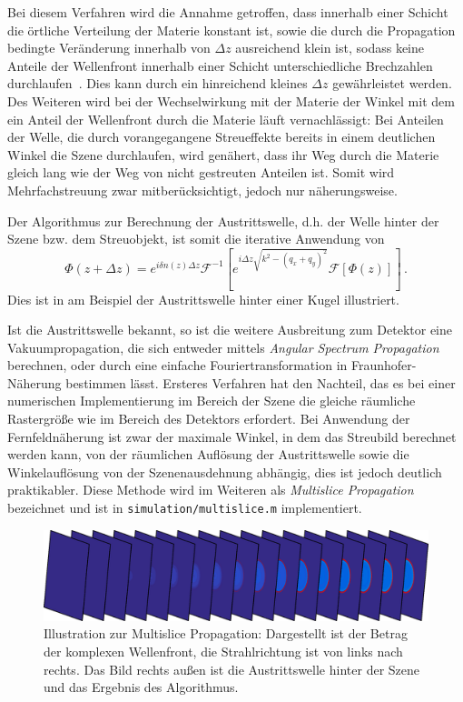 Bei diesem Verfahren wird die Annahme getroffen, dass  innerhalb einer Schicht die örtliche Verteilung der Materie konstant ist, sowie die durch die Propagation bedingte Veränderung innerhalb von $\Delta z$ ausreichend klein ist, sodass keine Anteile der Wellenfront innerhalb einer Schicht unterschiedliche Brechzahlen durchlaufen~\cite{hare1994}. Dies kann durch ein hinreichend kleines $\Delta z$ gewährleistet werden. 
Des Weiteren wird bei der Wechselwirkung mit der Materie der Winkel mit dem ein Anteil der Wellenfront durch die Materie läuft vernachlässigt: Bei Anteilen der Welle, die durch vorangegangene Streueffekte bereits in einem deutlichen Winkel die Szene durchlaufen, wird genähert, dass ihr Weg durch die Materie gleich lang wie der Weg von nicht gestreuten Anteilen ist. Somit wird Mehrfachstreuung zwar mitberücksichtigt, jedoch nur näherungsweise.
	
Der Algorithmus zur Berechnung der Austrittswelle, d.h. der Welle hinter der Szene bzw. dem Streuobjekt, ist somit die iterative Anwendung von
\begin{equation}
	\label{eq:multislice}
	\Phi(z+\Delta z)= e^{i\delta n\left(z\right) \Delta z}\mathscr{F}^{-1}\left[e^{i\Delta z\sqrt{k^2-(q_x+q_y)^2}}\mathscr{F}\left[\Phi(z)\right]\right] \,.
\end{equation}
Dies ist in  am Beispiel der Austrittswelle hinter einer Kugel illustriert.

Ist die Austrittswelle bekannt, so ist die weitere Ausbreitung zum Detektor eine Vakuumpropagation, die sich entweder mittels \textit{Angular Spectrum Propagation} berechnen, oder durch eine einfache Fouriertransformation in Fraunhofer-Näherung bestimmen lässt. Ersteres Verfahren hat den Nachteil, das es bei einer numerischen Implementierung im Bereich der Szene die gleiche räumliche Rastergröße wie im Bereich des Detektors erfordert. Bei Anwendung der Fernfeldnäherung ist zwar der maximale Winkel, in dem das Streubild berechnet werden kann, von der räumlichen Auflösung der Austrittswelle sowie die Winkelauflösung von der Szenenausdehnung abhängig, dies ist jedoch deutlich praktikabler.
Diese Methode wird im Weiteren als \textit{Multislice Propagation} bezeichnet und ist in \texttt{simulation/multislice.m} implementiert.

\begin{figure}
	\centering
	\includegraphics[width=1\textwidth]{images/slice_multislice.png}
	\caption[Illustration Multislice Propagation]{Illustration zur Multislice Propagation: Dargestellt ist der Betrag der komplexen Wellenfront, die Strahlrichtung ist von links nach rechts. Das Bild rechts außen ist die Austrittswelle hinter der Szene und das Ergebnis des Algorithmus.}
	\label{fig:slice_multislice}
\end{figure} 
	
